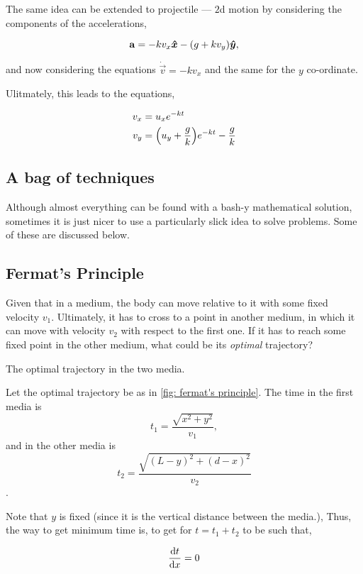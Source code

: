 The same idea can be extended to projectile --- \(2\)d motion 
by considering the components of the accelerations,

\[
    \boldsymbol{\mathbf{a}} = -kv_x \boldsymbol{\hat{x}} - (g + kv_y) \boldsymbol{\hat{y}},
\]

and now considering the equations \(\dot{\vec{v}} = -kv_x\)
and the same for the \(y\) co-ordinate. 

Ulitmately, this leads to the equations,

\begin{align}
    v_x &= u_x e^{-kt} \\
    v_y &= \qty(u_y + \frac{g}{k})e^{-kt} - \frac{g}{k}
\end{align}

\subsection{A bag of techniques}

Although almost everything can be found with a bash-y mathematical solution, sometimes 
it is just nicer to use a particularly slick idea to solve problems. Some of these are discussed 
below.

\subsection{Fermat's Principle}

Given that in a medium, the body can move relative to it with some fixed 
velocity \(v_1\). Ultimately, it has to cross to a point in another medium, in which 
it can move with velocity \(v_2\) with respect to the first one. If it has to reach 
some fixed point in the other medium, what could be its \emph{optimal} trajectory?

\begin{marginfigure}
    \centering
    \caption{The optimal trajectory in the two media.}
    \label{fig: fermat's principle}
\end{marginfigure}

Let the optimal trajectory be as in \cref{fig: fermat's principle}. The time in the first media
is \[t_1 = \frac{\sqrt{x^2 + y^2}}{v_1},\] and in the other media is \[t_2 = \frac{\sqrt{(L-y)^2 + (d-x)^2}}{v_2}\].

Note that \(y\) is fixed (since it is the vertical distance between the media.), Thus, 
the way to get minimum time is, to get for \(t = t_1 + t_2\) to be such that,

\begin{equation*}
    \dv{t}{x} = 0
\end{equation*}

